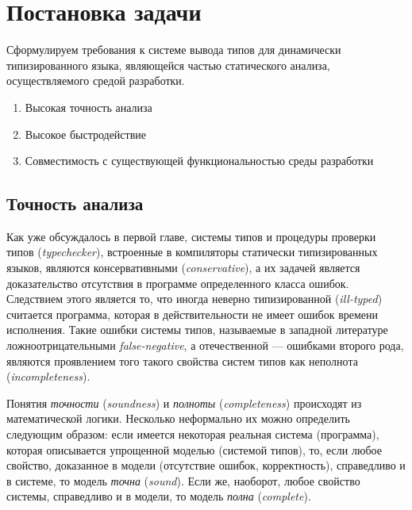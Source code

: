 \chapter{Постановка задачи}

Сформулируем требования к системе вывода типов для динамически
типизированного языка, являющейся частью статического анализа, осуществляемого
средой разработки.

\begin{enumerate}
    \item{Высокая точность анализа}
    \item{Высокое быстродействие}
    \item{Совместимость с существующей функциональностью среды разработки}
\end{enumerate}

\section{Точность анализа}
\label{sec:precision-requirement}

Как уже обсуждалось в первой главе, системы типов и процедуры проверки типов
(\emph{typechecker}), встроенные в компиляторы статически типизированных
языков, являются консервативными (\emph{conservative}), а их задачей является
доказательство отсутствия в программе определенного класса ошибок. Следствием
этого является то, что иногда неверно типизированной (\emph{ill-typed})
считается программа, которая в действительности не имеет ошибок времени
исполнения. Такие ошибки системы типов, называемые в западной литературе
ложноотрицательными \emph{false-negative}, а отечественной --- ошибками второго
рода, являются проявлением того такого свойства систем типов как неполнота
(\emph{incompleteness}). 

Понятия \emph{точности} (\emph{soundness}) и \emph{полноты}
(\emph{completeness}) происходят из математической логики. Несколько неформально
их можно определить следующим образом: если имеется некоторая реальная система
(программа), которая описывается упрощенной моделью (системой типов), то, если
любое свойство, доказанное в модели (отсутствие ошибок, корректность),
справедливо и в системе, то модель \emph{точна} (\emph{sound}).  Если же,
наоборот, любое свойство системы, справедливо и в модели, то модель \emph{полна}
(\emph{complete}).


